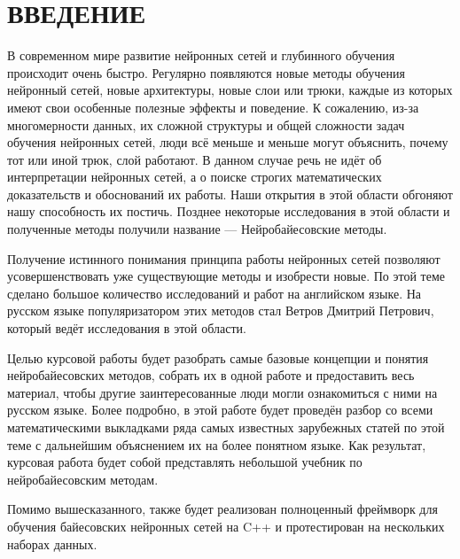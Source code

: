\chapter*{\large ВВЕДЕНИЕ}
В современном мире развитие нейронных сетей и глубинного обучения происходит очень быстро. Регулярно появляются новые методы обучения нейронный сетей,
 новые архитектуры, новые слои или трюки, каждые из которых имеют свои особенные полезные эффекты и поведение. К сожалению, из-за многомерности данных, их сложной структуры и общей
 сложности задач обучения нейронных сетей, люди всё меньше и меньше могут объяснить, почему тот или иной трюк, слой работают. В данном случае речь не идёт об
 интерпретации нейронных сетей, а о поиске строгих математических доказательств и обоснований их работы. Наши открытия в этой области обгоняют
 нашу способность их постичь. Позднее некоторые исследования в этой области и полученные методы получили название --- Нейробайесовские методы.

Получение истинного понимания принципа работы нейронных сетей позволяют усовершенствовать уже существующие методы и изобрести новые. По этой теме сделано
 большое количество исследований и работ на английском языке. На русском языке популяризатором этих методов стал Ветров Дмитрий Петрович, который ведёт исследования в этой области.

Целью курсовой работы будет разобрать самые базовые концепции и понятия нейробайесовских методов, собрать их в одной работе и предоставить весь материал, чтобы
 другие заинтересованные люди могли ознакомиться с ними на русском языке. Более подробно, в этой работе будет проведён разбор со всеми математическими выкладками ряда самых известных зарубежных статей по этой теме
 с дальнейшим объяснением их на более понятном языке. Как результат, курсовая работа будет собой представлять небольшой учебник по нейробайесовским методам.

Помимо вышесказанного, также будет реализован полноценный фреймворк для обучения байесовских нейронных сетей на C++ и протестирован на нескольких наборах данных.

